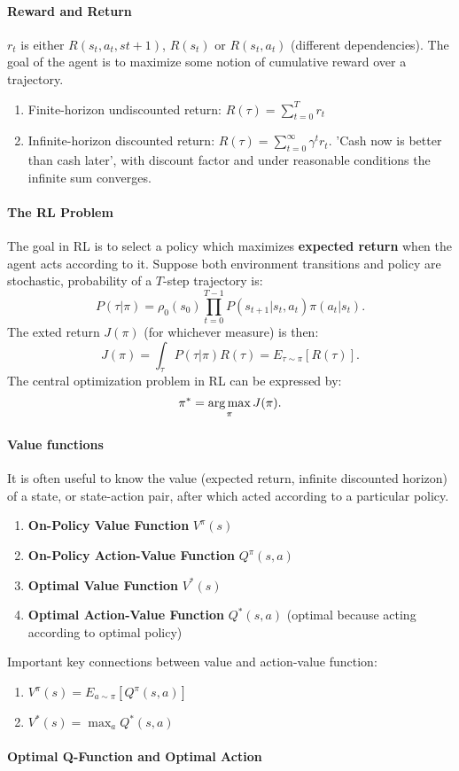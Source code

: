 \paragraph{Reward and Return} $r_t$ is either $R(s_t, a_t, s{t+1})$, $R(s_t)$ or $R(s_t, a_t)$ (different dependencies). The goal of the agent is to maximize some notion of cumulative reward over a trajectory.
\begin{enumerate}
    \item
        Finite-horizon undiscounted return: $R(\tau) = \sum_{t=0}^T r_t$
    \item
        Infinite-horizon discounted return: $R(\tau) = \sum_{t=0}^{\infty} \gamma^t r_t$. 'Cash now is better than cash later', with discount factor and under reasonable conditions the infinite sum converges.
\end{enumerate}

\paragraph{The RL Problem} The goal in RL is to select a policy which maximizes \textbf{expected return} when the agent acts according to it. Suppose both environment transitions and policy are stochastic, probability of a $T$-step trajectory is: 
$$P(\tau | \pi) = \rho_0(s_0) \prod_{t=0}^{T-1} P(s_{t+1} | s_t, a_t) \pi(a_t | s_t).$$
The exted return $J(\pi)$ (for whichever measure) is then: 
$$J(\pi) = \int_{\tau} P(\tau | \pi) R(\tau) = E_{\tau \sim \pi}[R(\tau)].$$
The central optimization problem in RL can be expressed by:
$$\pi^* = \operatorname*{arg\,max}_{\pi} J(\pi).$$

\paragraph{Value functions} It is often useful to know the value (expected return, infinite discounted horizon) of a state, or state-action pair, after which acted according to a particular policy. 
\begin{enumerate}
    \item
        \textbf{On-Policy Value Function} $V^{\pi}(s)$ 
    \item
        \textbf{On-Policy Action-Value Function} $Q^{\pi}(s,a)$ 
    \item
        \textbf{Optimal Value Function} $V^{*}(s)$ 
    \item
        \textbf{Optimal Action-Value Function} $Q^*(s,a)$ (optimal because acting according to optimal policy)
\end{enumerate}
Important key connections between value and action-value function:
\begin{enumerate}
    \item
        $V^{\pi}(s) = E_{a \sim \pi} [Q^{\pi}(s,a)]$
    \item
        $V^*(s) = \max_{a} Q^*(s,a)$
\end{enumerate}

\paragraph{Optimal Q-Function and Optimal Action}

